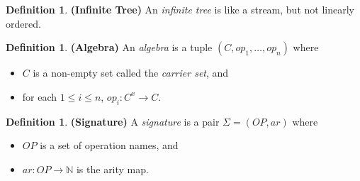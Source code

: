 \documentclass{amsart}
\theoremstyle{definition}
\newtheorem{definition}[thm]{Definition}
\begin{document}
\begin{definition}\textbf{(Infinite Tree)} An \textit{infinite tree} is like a stream, but not linearly ordered.
\end{definition}

\begin{definition}\textbf{(Algebra)} An \textit{algebra} is a tuple $(C, op_1, \dots, op_n)$ where
\begin{itemize}
\item $C$ is a non-empty set called the \textit{carrier set}, and
\item for each $1 \leq i \leq n$, $op_i : C^x \to C$.
\end{itemize}
\end{definition}

\begin{definition}\textbf{(Signature)} A \textit{signature} is a pair $\Sigma = (OP, ar)$ where
\begin{itemize}
\item $OP$ is a set of operation names, and
\item $ar : OP \to \mathbb N$ is the arity map.
\end{itemize}
\end{definition}
\end{document}
